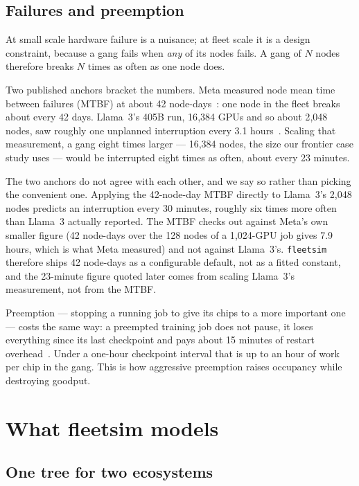 \subsection{Failures and preemption}
\label{sec:failures}

At small scale hardware failure is a nuisance; at fleet scale it is a design
constraint, because a gang fails when \emph{any} of its nodes fails. A gang of
$N$ nodes therefore breaks $N$ times as often as one node does.

Two published anchors bracket the numbers. Meta measured node mean time between
failures (MTBF) at about 42 node-days~\cite{metareliability2024}: one node in
the fleet breaks about every 42 days. Llama~3's 405B run, 16{,}384 GPUs and so
about 2{,}048 nodes, saw roughly one unplanned interruption every 3.1
hours~\cite{llama3}. Scaling that measurement, a gang eight times larger ---
16{,}384 nodes, the size our frontier case study uses --- would be interrupted
eight times as often, about every 23 minutes.

The two anchors do not agree with each other, and we say so rather than picking
the convenient one. Applying the 42-node-day MTBF directly to Llama~3's 2{,}048
nodes predicts an interruption every 30 minutes, roughly six times more often
than Llama~3 actually reported. The MTBF checks out against Meta's own smaller
figure (42 node-days over the 128 nodes of a 1{,}024-GPU job gives 7.9 hours,
which is what Meta measured) and not against Llama~3's. \texttt{fleetsim}
therefore ships 42 node-days as a configurable default, not as a fitted
constant, and the 23-minute figure quoted later comes from scaling Llama~3's
measurement, not from the MTBF.

Preemption --- stopping a running job to give its chips to a more important one
--- costs the same way: a preempted training job does not pause, it loses
everything since its last checkpoint and pays about 15 minutes of restart
overhead~\cite{metareliability2024}. Under a one-hour checkpoint interval that is
up to an hour of work per chip in the gang. This is how aggressive
preemption raises occupancy while destroying goodput.

\section{What fleetsim models}
\label{sec:models}

\subsection{One tree for two ecosystems}

